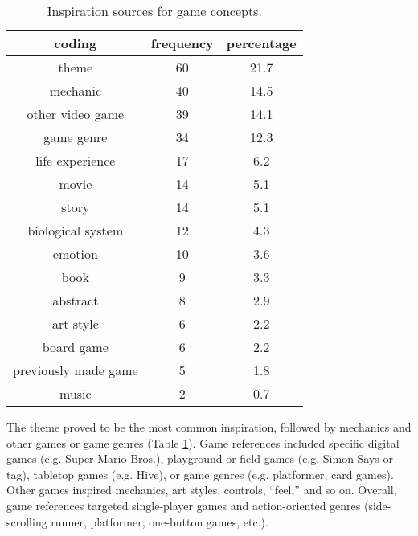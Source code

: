 \documentclass{sig-alternate}
\begin{document}
\begin{table}[tb]
\centering
\scriptsize
\begin{tabular}{|c|c|c|}
\hline coding & frequency & percentage \\ 
\hline theme & 60 & 21.7 \\ 
\hline mechanic & 40 & 14.5 \\ 
\hline other video game & 39 & 14.1  \\ 
\hline game genre & 34 & 12.3 \\ 
\hline life experience & 17 & 6.2 \\ 
\hline movie & 14 & 5.1 \\ 
\hline story & 14 & 5.1 \\ 
\hline biological system & 12 & 4.3 \\ 
\hline emotion & 10 & 3.6 \\ 
\hline book & 9 & 3.3 \\ 
\hline abstract & 8 & 2.9 \\ 
\hline art style & 6 & 2.2 \\ 
\hline board game & 6 & 2.2 \\ 
\hline previously made game & 5 & 1.8 \\ 
\hline music & 2 & 0.7 \\ 
\hline 
\end{tabular}
\caption{Inspiration sources for game concepts.}
\label{tab:inspiration}
\end{table}



The theme proved to be the most common inspiration, followed by mechanics and other games or game genres (Table \ref{tab:inspiration}).
Game references included specific digital games (e.g. Super Mario Bros.), playground or field games (e.g. Simon Says or tag), tabletop games (e.g. Hive), or game genres (e.g. platformer, card games). Other games inspired mechanics, art styles, controls, ``feel,'' and so on. 
Overall, game references targeted single-player games and action-oriented genres (side-scrolling runner, platformer, one-button games, etc.).
\end{document}

